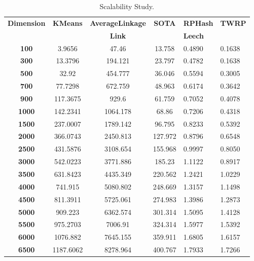 \begin{center}
 \begin{table}
 \centering
\begin{tabular}{|c|c|c|c|l|l|}\hline
\cellcolor[gray]{0.9}\textbf{Dimension}&\cellcolor[gray]{0.9}\textbf{KMeans}&\cellcolor[gray]{0.9}\textbf{AverageLinkage}&\cellcolor[gray]{0.9}\textbf{SOTA}&\cellcolor[gray]{0.9}\textbf{RPHash}&\cellcolor[gray]{0.9}\textbf{TWRP}\\

\cellcolor[gray]{0.9}&\cellcolor[gray]{0.9}&\cellcolor[gray]{0.9}\textbf{Link}&\cellcolor[gray]{0.9}
\cellcolor[gray]{0.9}&\cellcolor[gray]{0.9}\textbf{Leech}&\cellcolor[gray]{0.9}\\\hline 

\cellcolor[gray]{0.9}\textbf{100}&3.9656&47.46&13.758&0.4890&0.1638\\\hline
\cellcolor[gray]{0.9}\textbf{300}&13.3796&194.121&23.797&0.4782&0.1638\\\hline
\cellcolor[gray]{0.9}\textbf{500}&32.92&454.777&36.046&0.5594&0.3005\\\hline
\cellcolor[gray]{0.9}\textbf{700}&77.7298&672.759&48.963&0.6174&0.3642\\\hline
\cellcolor[gray]{0.9}\textbf{900}&117.3675&929.6&61.759&0.7052&0.4078\\\hline
\cellcolor[gray]{0.9}\textbf{1000}&142.2341&1064.178&68.86&0.7206&0.4318\\\hline
\cellcolor[gray]{0.9}\textbf{1500}&237.0007&1789.142&96.795&0.8233&0.5392\\\hline
\cellcolor[gray]{0.9}\textbf{2000}&366.0743&2450.813&127.972&0.8796&0.6548\\\hline
\cellcolor[gray]{0.9}\textbf{2500}&431.5876&3108.654&155.968&0.9997&0.8050\\\hline
\cellcolor[gray]{0.9}\textbf{3000}&542.0223&3771.886&185.23&1.1122&0.8917\\\hline
\cellcolor[gray]{0.9}\textbf{3500}&631.8423&4435.349&220.562&1.2421&1.0229\\\hline
\cellcolor[gray]{0.9}\textbf{4000}&741.915&5080.802&248.669&1.3157&1.1498\\\hline
\cellcolor[gray]{0.9}\textbf{4500}&811.3911&5725.061&274.983&1.3986&1.2873\\\hline
\cellcolor[gray]{0.9}\textbf{5000}&909.223&6362.574&301.314&1.5095&1.4128\\\hline
\cellcolor[gray]{0.9}\textbf{5500}&975.2703&7006.91&324.314&1.5977&1.5392\\\hline
\cellcolor[gray]{0.9}\textbf{6000}&1076.882&7645.155&359.911&1.6805&1.6157\\\hline
\cellcolor[gray]{0.9}\textbf{6500}&1187.6062&8278.964&400.767&1.7933&1.7266\\\hline
\end{tabular}
\caption{Scalability Study.}\label{scalability}
\end{table}
\end{center}

